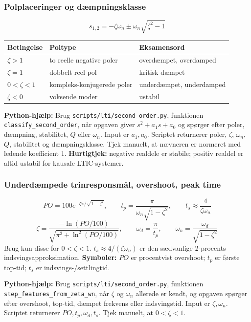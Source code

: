 \subsubsection{Polplaceringer og dæmpningsklasse}
\[
s_{1,2}=-\zeta\omega_n\pm \omega_n\sqrt{\zeta^2-1}
\]
\begin{tabular}{lll}
\toprule
Betingelse & Poltype & Eksamensord \\
\midrule
\(\zeta>1\) & to reelle negative poler & overdæmpet, overdamped \\
\(\zeta=1\) & dobbelt reel pol & kritisk dæmpet \\
\(0<\zeta<1\) & kompleks-konjugerede poler & underdæmpet, underdamped \\
\(\zeta<0\) & voksende moder & ustabil \\
\bottomrule
\end{tabular}

\textbf{Python-hjælp:} Brug \texttt{scripts/lti/second\_order.py}, funktionen \texttt{classify\_second\_order}, når opgaven giver \(s^2+a_1s+a_0\) og spørger efter poler, dæmpning, stabilitet, \(Q\) eller \(\omega_n\). Input er \(a_1,a_0\). Scriptet returnerer poler, \(\zeta\), \(\omega_n\), \(Q\), stabilitet og dæmpningsklasse. Tjek manuelt, at nævneren er normeret med ledende koefficient \(1\).
\textbf{Hurtigtjek:} negative realdele er stabile; positiv realdel er altid ustabil for kausale LTIC-systemer.

\subsubsection{Underdæmpede trinresponsmål, overshoot, peak time}
\[
PO=100e^{-\zeta\pi/\sqrt{1-\zeta^2}},\qquad
t_p=\frac{\pi}{\omega_n\sqrt{1-\zeta^2}},\qquad
t_s\approx\frac{4}{\zeta\omega_n}
\]
\[
\zeta=\frac{-\ln(PO/100)}{\sqrt{\pi^2+\ln^2(PO/100)}},\qquad
\omega_d=\frac{\pi}{t_p},\qquad
\omega_n=\frac{\omega_d}{\sqrt{1-\zeta^2}}
\]
Brug kun disse for \(0<\zeta<1\). \(t_s\approx4/(\zeta\omega_n)\) er den sædvanlige 2-procents indsvingsapproksimation.
\textbf{Symboler:} \(PO\) er procentvist overshoot; \(t_p\) er første top-tid; \(t_s\) er indsvings-/settlingtid.

\textbf{Python-hjælp:} Brug \texttt{scripts/lti/second\_order.py}, funktionen \texttt{step\_features\_from\_zeta\_wn}, når \(\zeta\) og \(\omega_n\) allerede er kendt, og opgaven spørger efter overshoot, top-tid, dæmpet frekvens eller indsvingstid. Input er \(\zeta,\omega_n\). Scriptet returnerer \(PO,t_p,\omega_d,t_s\). Tjek manuelt, at \(0<\zeta<1\).


